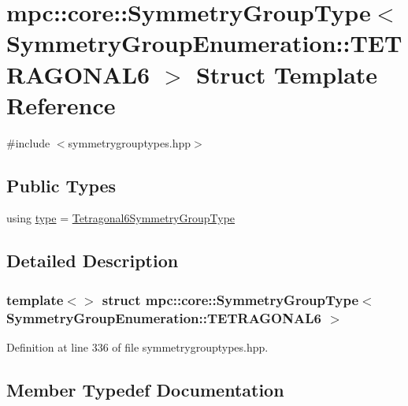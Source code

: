 \hypertarget{structmpc_1_1core_1_1_symmetry_group_type_3_01_symmetry_group_enumeration_1_1_t_e_t_r_a_g_o_n_a_l6_01_4}{}\section{mpc\+:\+:core\+:\+:Symmetry\+Group\+Type$<$ Symmetry\+Group\+Enumeration\+:\+:T\+E\+T\+R\+A\+G\+O\+N\+A\+L6 $>$ Struct Template Reference}
\label{structmpc_1_1core_1_1_symmetry_group_type_3_01_symmetry_group_enumeration_1_1_t_e_t_r_a_g_o_n_a_l6_01_4}


{\ttfamily \#include $<$symmetrygrouptypes.\+hpp$>$}

\subsection*{Public Types}
\begin{DoxyCompactItemize}
\item 
using \mbox{\hyperlink{structmpc_1_1core_1_1_symmetry_group_type_3_01_symmetry_group_enumeration_1_1_t_e_t_r_a_g_o_n_a_l6_01_4_a5a59ef59ad26662e942639a2243dc2e7}{type}} = \mbox{\hyperlink{structmpc_1_1core_1_1_tetragonal6_symmetry_group_type}{Tetragonal6\+Symmetry\+Group\+Type}}
\end{DoxyCompactItemize}


\subsection{Detailed Description}
\subsubsection*{template$<$$>$\newline
struct mpc\+::core\+::\+Symmetry\+Group\+Type$<$ Symmetry\+Group\+Enumeration\+::\+T\+E\+T\+R\+A\+G\+O\+N\+A\+L6 $>$}



Definition at line 336 of file symmetrygrouptypes.\+hpp.



\subsection{Member Typedef Documentation}
\mbox{\label{structmpc_1_1core_1_1_symmetry_group_type_3_01_symmetry_group_enumeration_1_1_t_e_t_r_a_g_o_n_a_l6_01_4_a5a59ef59ad26662e942639a2243dc2e7}} 
